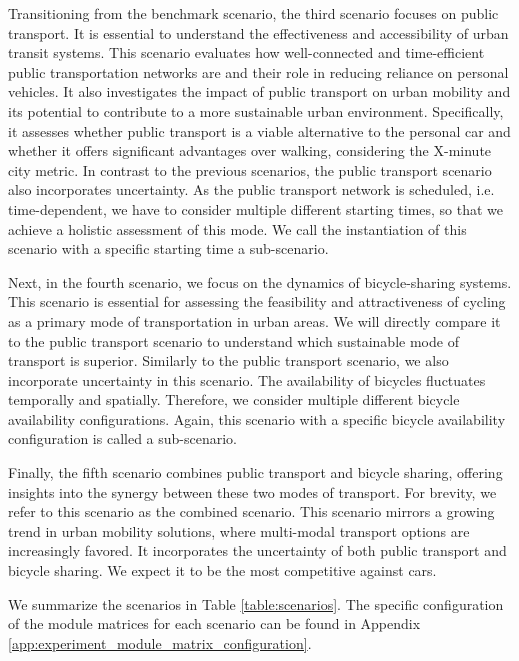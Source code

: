 Transitioning from the benchmark scenario, the third scenario focuses on public transport. 
It is essential to understand the effectiveness and accessibility of urban transit systems. 
This scenario evaluates how well-connected and time-efficient public transportation networks are and their role in reducing reliance on personal vehicles. 
It also investigates the impact of public transport on urban mobility and its potential to contribute to a more sustainable urban environment. 
Specifically, it assesses whether public transport is a viable alternative to the personal car and whether it offers significant advantages over walking, considering the X-minute city metric.
In contrast to the previous scenarios, the public transport scenario also incorporates uncertainty.
As the public transport network is scheduled, i.e. time-dependent, we have to consider multiple different starting times, so that we achieve a holistic assessment of this mode.
We call the instantiation of this scenario with a specific starting time a sub-scenario.

Next, in the fourth scenario, we focus on the dynamics of bicycle-sharing systems. 
This scenario is essential for assessing the feasibility and attractiveness of cycling as a primary mode of transportation in urban areas. 
We will directly compare it to the public transport scenario to understand which sustainable mode of transport is superior.
Similarly to the public transport scenario, we also incorporate uncertainty in this scenario.
The availability of bicycles fluctuates temporally and spatially.
Therefore, we consider multiple different bicycle availability configurations.
Again, this scenario with a specific bicycle availability configuration is called a sub-scenario.

Finally, the fifth scenario combines public transport and bicycle sharing, offering insights into the synergy between these two modes of transport.
For brevity, we refer to this scenario as the combined scenario.
This scenario mirrors a growing trend in urban mobility solutions, where multi-modal transport options are increasingly favored. 
It incorporates the uncertainty of both public transport and bicycle sharing.
We expect it to be the most competitive against cars.

We summarize the scenarios in Table \ref{table:scenarios}.
The specific configuration of the module matrices for each scenario can be found in Appendix \ref{app:experiment_module_matrix_configuration}.

